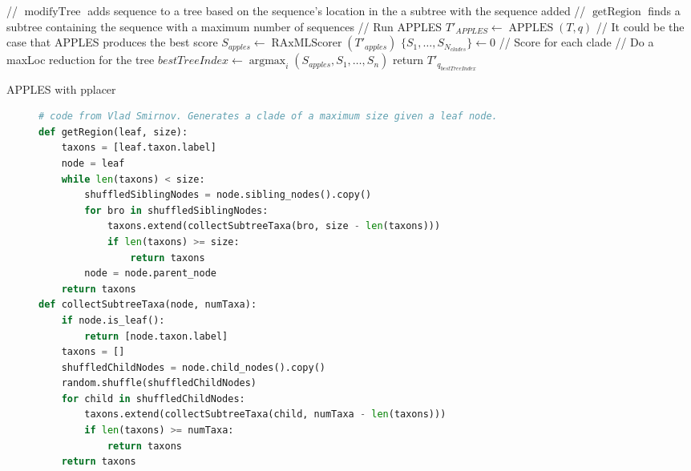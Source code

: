 \documentclass[10pt]{article}
\begin{document}
\begin{algorithm}[H]
\SetAlgoLined
{}
 // $\operatorname{modifyTree}$ adds sequence to a tree based on the sequence's location in the a subtree with the sequence added\;
 // $\operatorname{getRegion}$ finds a subtree containing the sequence with a maximum number of sequences\;
  // Run APPLES\;
  $T'_{APPLES} \leftarrow \operatorname{APPLES}(T, q)$\;
  // It could be the case that APPLES produces the best score\;
  $S_{apples} \leftarrow \operatorname{RAxMLScorer}( T'_{apples})$\;
  $\{S_1, \dots, S_{N_{clades}}\} \leftarrow 0$ // Score for each clade\;
 // Do a maxLoc reduction for the tree\;
 $bestTreeIndex \leftarrow \operatorname{argmax}_{i} (S_{apples},S_1,\dots,S_n)$\;
 return $T'_{q_{bestTreeIndex}}$\;
\caption{APPLES with pplacer}
 \label{alg:approach2}
\end{algorithm}

\begin{figure}[H]
\centering
\begin{lstlisting}[language=python]
# code from Vlad Smirnov. Generates a clade of a maximum size given a leaf node.
def getRegion(leaf, size):
    taxons = [leaf.taxon.label]
    node = leaf
    while len(taxons) < size:
        shuffledSiblingNodes = node.sibling_nodes().copy()
        for bro in shuffledSiblingNodes:
            taxons.extend(collectSubtreeTaxa(bro, size - len(taxons)))
            if len(taxons) >= size:
                return taxons
        node = node.parent_node
    return taxons
def collectSubtreeTaxa(node, numTaxa):
    if node.is_leaf():
        return [node.taxon.label]
    taxons = []
    shuffledChildNodes = node.child_nodes().copy()
    random.shuffle(shuffledChildNodes)
    for child in shuffledChildNodes:
        taxons.extend(collectSubtreeTaxa(child, numTaxa - len(taxons)))
        if len(taxons) >= numTaxa:
            return taxons
    return taxons
\end{lstlisting}
\label{alg:clade-grabber}
\end{figure}



\end{document}
